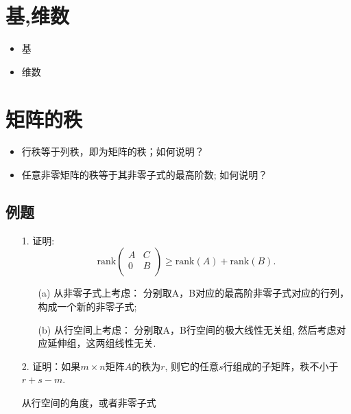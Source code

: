 \section{基,维数}
\begin{itemize}
	\item 基
	\item 维数
\end{itemize}

\section{矩阵的秩}
\begin{itemize}
	\item 行秩等于列秩，即为矩阵的秩；如何说明？
	\item 任意非零矩阵的秩等于其非零子式的最高阶数; 如何说明？
\end{itemize}

\subsection*{例题}
\begin{itemize}
	\item[1.] 证明:
	\begin{equation*}
	\text{rank}
	\begin{pmatrix}
		A& C\\
		0& B\\
	\end{pmatrix}
	\ge
	\text{rank}(A)
	+ \text{rank}(B).
	\end{equation*}
	\begin{solution}
	\begin{enumerate}
	\item [(a)] 从非零子式上考虑：
	分别取A，B对应的最高阶非零子式对应的行列，构成一个新的非零子式;
	\item [(b)] 从行空间上考虑：
	分别取A，B行空间的极大线性无关组, 然后考虑对应延伸组，这两组线性无关.
	\end{enumerate}
	\end{solution}
	\vspace{2cm}

	\item[2.] 证明：如果$m\times n$矩阵$A$的秩为$r$, 则它的任意$s$行组成的子矩阵，秩不小于$r+s-m$.
	\begin{solution}
		从行空间的角度，或者非零子式
	\end{solution}
	\vspace{1cm}
\end{itemize}

